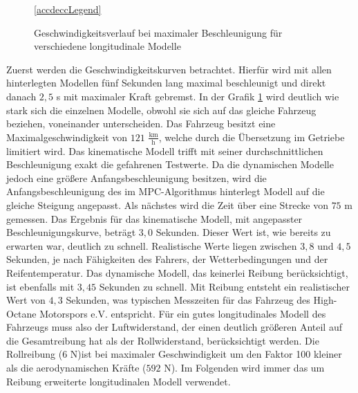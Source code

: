 \documentclass{like}
\begin{document}
\begin{figure}
	\centering
	 
	\ref{accdeccLegend}
	\caption{Geschwindigkeitsverlauf bei maximaler Beschleunigung für verschiedene longitudinale Modelle}
	\label{fig:accdec}
\end{figure}
Zuerst werden die Geschwindigkeitskurven betrachtet. Hierfür wird mit allen hinterlegten Modellen fünf Sekunden lang maximal beschleunigt und direkt danach $2,5$ s mit maximaler Kraft gebremst.
In der Grafik \ref{fig:accdec} wird deutlich wie stark sich die einzelnen Modelle, obwohl sie sich auf das gleiche Fahrzeug beziehen, voneinander unterscheiden. Das Fahrzeug besitzt eine Maximalgeschwindigkeit von $121$  $\frac{\text{km}}{\text{h}}$, welche durch die Übersetzung im Getriebe limitiert wird. Das kinematische Modell trifft mit seiner durchschnittlichen Beschleunigung exakt die gefahrenen Testwerte. Da die dynamischen Modelle jedoch eine größere Anfangsbeschleunigung besitzen, wird die Anfangsbeschleunigung des im \ac{MPC}-Algorithmus hinterlegt Modell auf die gleiche Steigung angepasst. Als nächstes wird die Zeit über eine Strecke von $75$ m gemessen. Das Ergebnis für das kinematische Modell, mit angepasster Beschleunigungskurve, beträgt $3,0$ Sekunden. Dieser Wert ist, wie bereits zu erwarten war, deutlich zu schnell. Realistische Werte liegen zwischen $3,8$ und $4,5$ Sekunden, je nach Fähigkeiten des Fahrers, der Wetterbedingungen und der Reifentemperatur. Das dynamische Modell, das keinerlei Reibung berücksichtigt, ist ebenfalls mit $3,45$ Sekunden zu schnell. Mit Reibung entsteht ein realistischer Wert von $4,3$ Sekunden, was typischen Messzeiten für das Fahrzeug des High-Octane Motorspors e.V. entspricht. Für ein gutes longitudinales Modell des Fahrzeugs muss also der Luftwiderstand, der einen deutlich größeren Anteil auf die Gesamtreibung hat als der Rollwiderstand, berücksichtigt werden. Die Rollreibung ($6$ N)ist bei maximaler Geschwindigkeit um den Faktor 100 kleiner als die aerodynamischen Kräfte ($592$ N). Im Folgenden wird immer das um Reibung erweiterte longitudinalen Modell verwendet.
\end{document}
